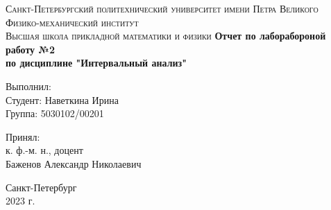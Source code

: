 \documentclass[a4paper,12pt]{article}
\begin{document}
\begin{titlepage}
    \begin{center}
        \textsc{
            Санкт-Петербургский политехнический университет имени Петра Великого \\[5mm]
            Физико-механический институт\\[2mm]
            Высшая школа прикладной математики и физики            
        }   
        \vfill
        \textbf{\large
            Отчет по лаборабороной работу №2\\
            по дисциплине "Интервальный анализ"\\[3mm]
        }                
    \end{center}

    \vfill
    \hfill
    \begin{minipage}{0.5\textwidth}
        Выполнил: \\[2mm]   
		Студент: Наветкина Ирина \\
		Группа: 5030102/00201\\
    \end{minipage}

	\hfill
	\begin{minipage}{0.5\textwidth}
		Принял: \\[2mm]
		к. ф.-м. н., доцент \\   
		Баженов Александр Николаевич
	\end{minipage}

    \vfill
    
    \begin{center}
    Санкт-Петербург\\
    2023 г.\\
    \end{center}
\end{titlepage}

\tableofcontents
\newpage
\end{document}
